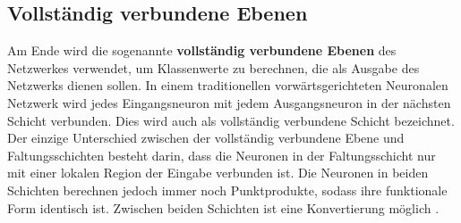 \subsection{Vollständig verbundene Ebenen}
Am Ende wird die sogenannte \textbf{vollständig verbundene Ebenen} des Netzwerkes verwendet, um Klassenwerte zu berechnen, die als Ausgabe des Netzwerks dienen sollen. In einem traditionellen vorwärtsgerichteten Neuronalen Netzwerk wird jedes Eingangsneuron mit jedem Ausgangsneuron in der nächsten Schicht verbunden. Dies wird auch als vollständig verbundene Schicht bezeichnet. Der einzige Unterschied zwischen der vollständig verbundene Ebene und Faltungsschichten besteht darin, dass die Neuronen in der Faltungsschicht nur mit einer lokalen Region der Eingabe verbunden ist. Die Neuronen in beiden Schichten berechnen jedoch immer noch Punktprodukte, sodass ihre funktionale Form identisch ist. Zwischen beiden Schichten ist eine Konvertierung möglich \cite*{StanfordUniversityCoursecs231n2018a}.

